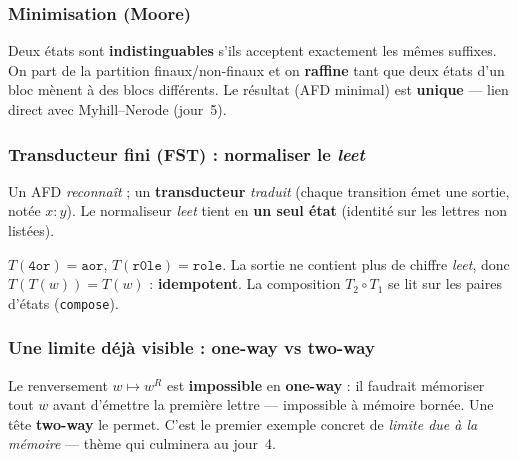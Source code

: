 \documentclass[11pt,a4paper]{scrartcl}
\begin{document}
\subsubsection{Minimisation (Moore)}
Deux états sont \textbf{indistinguables} s'ils acceptent exactement les mêmes suffixes. On
part de la partition finaux/non-finaux et on \textbf{raffine} tant que deux états d'un bloc
mènent à des blocs différents. Le résultat (AFD minimal) est \textbf{unique} — lien direct
avec Myhill--Nerode (jour~5).

\subsubsection{Transducteur fini (FST) : normaliser le \emph{leet}}
Un AFD \emph{reconnaît} ; un \textbf{transducteur} \emph{traduit} (chaque transition émet
une sortie, notée $x\!:\!y$). Le normaliseur \emph{leet} tient en \textbf{un seul état}
(identité sur les lettres non listées).
\begin{center}
\end{center}
\begin{exemple}[Idempotence]
$T(\texttt{4or})=\texttt{aor}$, $T(\texttt{r0le})=\texttt{role}$. La sortie ne contient
plus de chiffre \emph{leet}, donc $T(T(w))=T(w)$ : \textbf{idempotent}. La composition
$T_2\circ T_1$ se lit sur les paires d'états (\texttt{compose}).
\end{exemple}

\subsubsection{Une limite déjà visible : one-way vs two-way}
Le renversement $w\mapsto w^{R}$ est \textbf{impossible} en \textbf{one-way} : il faudrait
mémoriser tout $w$ avant d'émettre la première lettre — impossible à mémoire bornée. Une
tête \textbf{two-way} le permet. C'est le premier exemple concret de \emph{limite due à la
mémoire} — thème qui culminera au jour~4.
\end{document}
